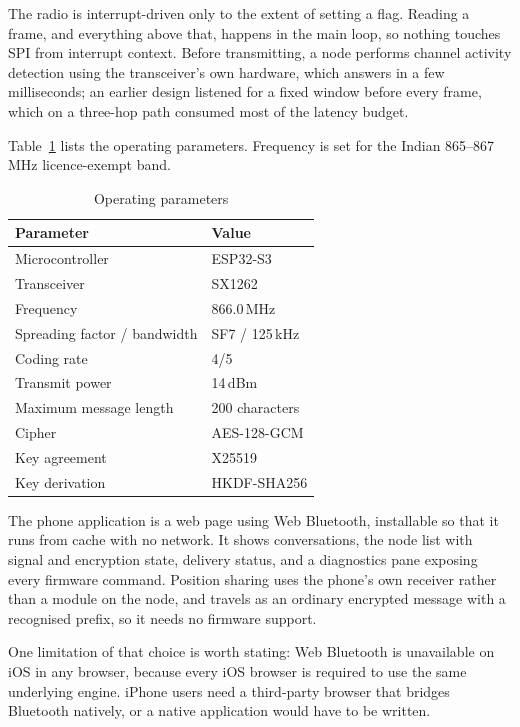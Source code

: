 \documentclass[conference]{IEEEtran}
\begin{document}
The radio is interrupt-driven only to the extent of setting a flag. Reading a
frame, and everything above that, happens in the main loop, so nothing touches
SPI from interrupt context. Before transmitting, a node performs channel activity
detection using the transceiver's own hardware, which answers in a few
milliseconds; an earlier design listened for a fixed window before every frame,
which on a three-hop path consumed most of the latency budget.

Table~\ref{tab:params} lists the operating parameters. Frequency is set for the
Indian 865--867\,MHz licence-exempt band.

\begin{table}[!t]
\caption{Operating parameters}
\label{tab:params}
\centering
\footnotesize
\begin{tabular}{@{}ll@{}}
\toprule
Parameter & Value \\
\midrule
Microcontroller & ESP32-S3 \\
Transceiver & SX1262 \\
Frequency & 866.0\,MHz \\
Spreading factor / bandwidth & SF7 / 125\,kHz \\
Coding rate & 4/5 \\
Transmit power & 14\,dBm \\
Maximum message length & 200 characters \\
Cipher & AES-128-GCM \\
Key agreement & X25519 \\
Key derivation & HKDF-SHA256 \\
\bottomrule
\end{tabular}
\end{table}

The phone application is a web page using Web Bluetooth, installable so that it
runs from cache with no network. It shows conversations, the node list with
signal and encryption state, delivery status, and a diagnostics pane exposing
every firmware command. Position sharing uses the phone's own receiver rather
than a module on the node, and travels as an ordinary encrypted message with a
recognised prefix, so it needs no firmware support.

One limitation of that choice is worth stating: Web Bluetooth is unavailable on
iOS in any browser, because every iOS browser is required to use the same
underlying engine. iPhone users need a third-party browser that bridges
Bluetooth natively, or a native application would have to be written.
\end{document}
